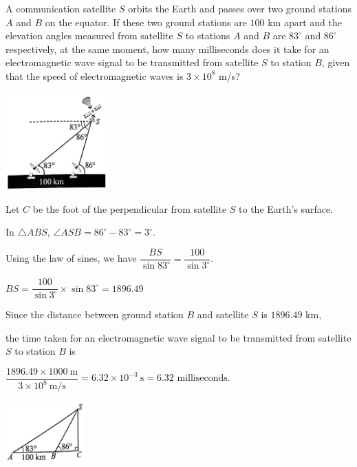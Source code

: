 \documentclass{report}
\begin{document}
    \begin{question}
        \begin{vwcol}[widths={0.6,0.4}, sep=8mm, rule=0pt]
            A communication satellite $S$ orbits the Earth and passes over two ground stations $A$ and $B$ on the equator. If these two ground stations are $100$ km apart and the elevation angles measured from satellite $S$ to stations $A$ and $B$ are $83^\circ$ and $86^\circ$ respectively, at the same moment, how many milliseconds does it take for an electromagnetic wave signal to be transmitted from satellite $S$ to station $B$, given that the speed of electromagnetic waves is $3 \times 10^8$ m/s?
            
            \includegraphics[width=0.3\textwidth]{assets/10-57.jpg}
        \end{vwcol}

        \sol{}
        \begin{vwcol}[widths={0.6,0.4}, sep=8mm, rule=0pt,justify=flushleft]
            \noindent Let $C$ be the foot of the perpendicular from satellite $S$ to the Earth's surface.

            \noindent In $\triangle ABS$, $\angle ASB = 86^\circ - 83^\circ = 3^\circ$.

            \vspace{1em}
            \noindent Using the law of sines, we have $\dfrac{BS}{\sin 83^\circ} = \dfrac{100}{\sin 3^\circ}$.

            \noindent $
            BS = \dfrac{100}{\sin 3^\circ} \times \sin 83^\circ = 1896.49
            $

            \vspace{1em}
            \noindent Since the distance between ground station $B$ and satellite $S$ is $1896.49$ km,

            \noindent the time taken for an electromagnetic wave signal to be transmitted from satellite $S$ to station $B$ is

            \vspace{1em}
            \noindent $
            \dfrac{1896.49 \times 1000 \mathrm{~m}}{3 \times 10^8 \mathrm{~m} / \mathrm{s}} = 6.32 \times 10^{-3} \mathrm{~s} = 6.32 \text{ milliseconds}.
            $

            \vspace{10em}
            \includegraphics[width=0.23\textwidth]{assets/10-58.jpg}
        \end{vwcol}
    \end{question}
\end{document}
